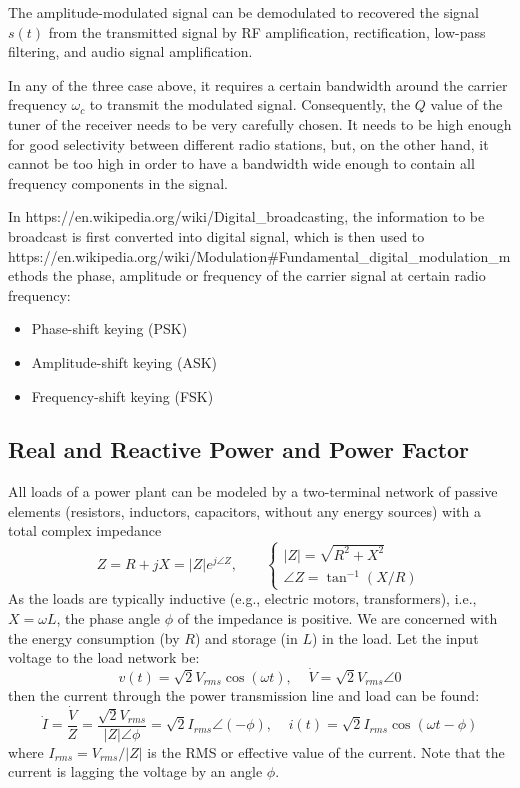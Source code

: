 The amplitude-modulated signal can be demodulated to recovered the signal
$s(t)$ from the transmitted signal by RF amplification, rectification, 
low-pass filtering, and audio signal amplification.

  

In any of the three case above, it requires a certain bandwidth around the
carrier frequency $\omega_c$ to transmit the modulated signal. Consequently, 
the $Q$ value of the tuner of the receiver needs to be very carefully chosen.
It needs to be high enough for good selectivity between different radio 
stations, but, on the other hand, it cannot be too high in order to have a 
bandwidth wide enough to contain all frequency components in the signal.

In 
{https://en.wikipedia.org/wiki/Digital_broadcasting},
the information to be broadcast is first converted into digital signal,
which is then used to 
{https://en.wikipedia.org/wiki/Modulation#Fundamental_digital_modulation_methods}
the phase, amplitude or frequency of the carrier signal at certain radio 
frequency:
\begin{itemize}
\item Phase-shift keying (PSK)
\item Amplitude-shift keying (ASK)
\item Frequency-shift keying (FSK)
\end{itemize}


\subsection*{Real and Reactive Power and Power Factor}


All loads of a power plant can be modeled by a two-terminal network of
passive elements (resistors, inductors, capacitors, without any energy 
sources) with a total complex impedance 
\[
Z=R+jX=|Z|e^{j\angle Z},\;\;\;\;\;\;\;
\left\{\begin{array}{ll}|Z|=\sqrt{R^2+X^2}\\\angle Z=\tan^{-1}(X/R)
\end{array}\right.
\]
As the loads are typically inductive (e.g., electric motors, transformers), 
i.e., $X=\omega L$, the phase angle $\phi$ of the impedance is positive. 
We are concerned with the energy consumption (by $R$) and storage (in $L$)
in the load. Let the input voltage to the load network be:
\[
v(t)=\sqrt{2}V_{rms} \cos(\omega t),\;\;\;\;\dot{V}=\sqrt{2}V_{rms}\angle 0 
\]
then the current through the power transmission line and load can be found:
\[
\dot{I}=\frac{\dot{V}}{Z}=\frac{\sqrt{2}V_{rms}}{|Z|\angle \phi}
=\sqrt{2}I_{rms}\angle(-\phi),\;\;\;\;i(t)=\sqrt{2}I_{rms} \cos(\omega t-\phi)  
\]
where $I_{rms}=V_{rms}/|Z|$ is the RMS or effective value of the current.
Note that the current is lagging the voltage by an angle $\phi$.

